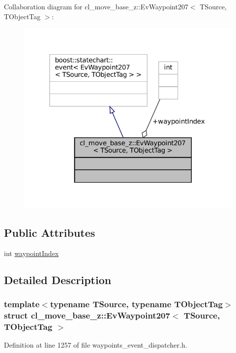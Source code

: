 Collaboration diagram for cl\+\_\+move\+\_\+base\+\_\+z\+:\+:Ev\+Waypoint207$<$ T\+Source, T\+Object\+Tag $>$\+:
\nopagebreak
\begin{figure}[H]
\begin{center}
\leavevmode
\includegraphics[width=319pt]{structcl__move__base__z_1_1EvWaypoint207__coll__graph}
\end{center}
\end{figure}
\subsection*{Public Attributes}
\begin{DoxyCompactItemize}
\item 
int \hyperlink{structcl__move__base__z_1_1EvWaypoint207_a5b2aaf2203b50e6524d48a271b681337}{waypoint\+Index}
\end{DoxyCompactItemize}


\subsection{Detailed Description}
\subsubsection*{template$<$typename T\+Source, typename T\+Object\+Tag$>$\newline
struct cl\+\_\+move\+\_\+base\+\_\+z\+::\+Ev\+Waypoint207$<$ T\+Source, T\+Object\+Tag $>$}



Definition at line 1257 of file waypoints\+\_\+event\+\_\+dispatcher.\+h.



